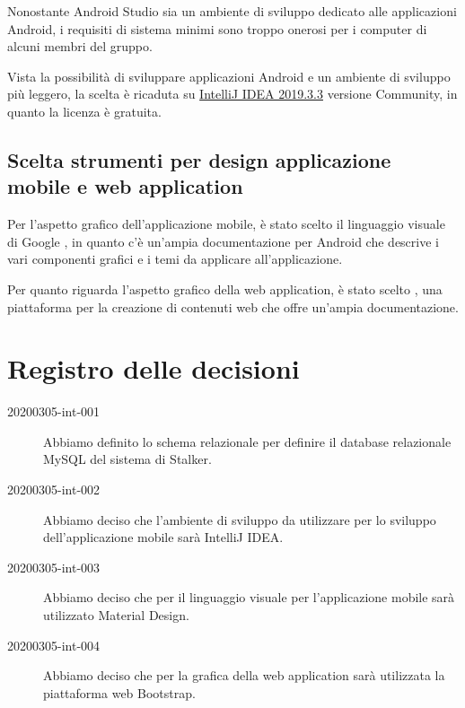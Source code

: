 \documentclass{article}
\begin{document}
Nonostante Android Studio sia un ambiente di sviluppo dedicato alle applicazioni Android, i requisiti di sistema minimi sono troppo onerosi per i computer di alcuni membri del gruppo.

Vista la possibilità di sviluppare applicazioni Android e un ambiente di sviluppo più leggero, la scelta è ricaduta su \href{https://www.jetbrains.com/help/idea/getting-started-with-android-development.html}{IntelliJ IDEA 2019.3.3} versione Community, in quanto la licenza è gratuita.

\subsection{Scelta strumenti per design applicazione mobile e web application}%
\label{sub:scelta_strumenti_per_design_applicazione_mobile_e_web_application}
Per l'aspetto grafico dell'applicazione mobile, è stato scelto il linguaggio visuale di Google \href{https://material.io/develop/android}{}, in quanto c'è un'ampia documentazione per Android che descrive i vari componenti grafici e i temi da applicare all'applicazione.

Per quanto riguarda l'aspetto grafico della web application, è stato scelto \href{https://getbootstrap.com/}{}, una piattaforma per la creazione di contenuti web che offre un'ampia documentazione.



\newpage
\section{Registro delle decisioni}%
\label{sec:registro_delle_decisioni}

\begin{description}
  \item[20200305-int-001] Abbiamo definito lo schema relazionale per definire il database relazionale MySQL del sistema di Stalker.
  \item[20200305-int-002] Abbiamo deciso che l'ambiente di sviluppo da utilizzare per lo sviluppo dell'applicazione mobile sarà IntelliJ IDEA\@.
  \item[20200305-int-003] Abbiamo deciso che per il linguaggio visuale per l'applicazione mobile sarà utilizzato Material Design.
  \item[20200305-int-004] Abbiamo deciso che per la grafica della web application sarà utilizzata la piattaforma web Bootstrap.
\end{description}

\end{document}
